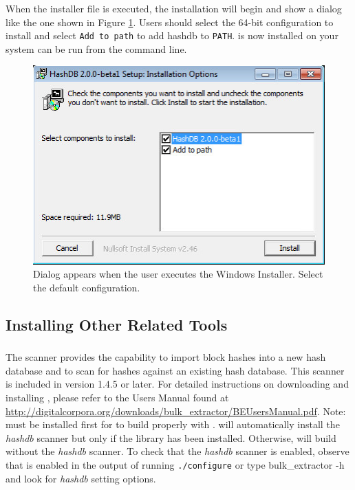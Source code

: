 \documentclass[11pt,fleqn]{article} %
\begin{document}
When the installer file is executed, the installation will begin and show a dialog like the one shown in Figure \ref{fig:windowsInstaller}.  Users should select the 64-bit configuration to install \hash and select \verb+Add to path+ to add hashdb to \verb+PATH+. \hash is now installed on your system can be run from the command line.\\

\begin{figure}
	\center
	\includegraphics[scale=.8]{WindowsInstaller.png}
	\caption{Dialog appears when the user executes the Windows Installer. Select the default configuration.}
	\label{fig:windowsInstaller}
\end{figure}

\subsection{Installing Other Related Tools}

\subsubsection{\bulk}
The \bulk \hash scanner provides the capability to import block hashes into a new hash database and to scan for hashes against an existing hash database.
This scanner is included in \bulk version 1.4.5 or later. For detailed instructions on downloading and installing \bulk, please refer to the Users Manual found at \url{http://digitalcorpora.org/downloads/bulk_extractor/BEUsersManual.pdf}. Note: \hash must be installed first for \bulk to build properly with \hash. \bulk will automatically install the \textit{hashdb} scanner but only if the \hash library has been installed. Otherwise, \bulk will build without the \textit{hashdb} scanner. To check that the \textit{hashdb} scanner is enabled, observe that is enabled in the output of running \texttt{./configure} or type {bulk\_extractor -h} and look for \textit{hashdb} setting options.\\
\end{document}
